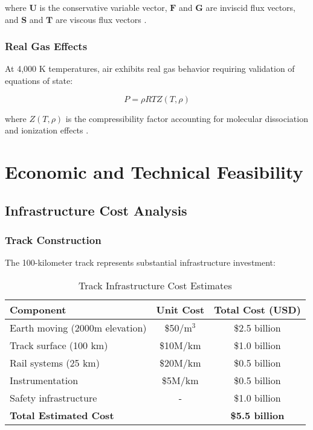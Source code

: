 \documentclass[12pt,a4paper]{article}
\begin{document}
where $\mathbf{U}$ is the conservative variable vector, $\mathbf{F}$ and $\mathbf{G}$ are inviscid flux vectors, and $\mathbf{S}$ and $\mathbf{T}$ are viscous flux vectors \cite{blazek2001computational}.

\subsubsection{Real Gas Effects}
At 4,000 K temperatures, air exhibits real gas behavior requiring validation of equations of state:

\begin{equation}
P = \rho R T Z(T,\rho)
\label{eq:real_gas}
\end{equation}

where $Z(T,\rho)$ is the compressibility factor accounting for molecular dissociation and ionization effects \cite{park1990nonequilibrium}.

\section{Economic and Technical Feasibility}

\subsection{Infrastructure Cost Analysis}

\subsubsection{Track Construction}
The 100-kilometer track represents substantial infrastructure investment:

\begin{table}[H]
\centering
\caption{Track Infrastructure Cost Estimates}
\label{tab:cost_estimates}
\begin{tabular}{lcc}
\toprule
Component & Unit Cost & Total Cost (USD) \\
\midrule
Earth moving (2000m elevation) & \$50/m$^3$ & \$2.5 billion \\
Track surface (100 km) & \$10M/km & \$1.0 billion \\
Rail systems (25 km) & \$20M/km & \$0.5 billion \\
Instrumentation & \$5M/km & \$0.5 billion \\
Safety infrastructure & - & \$1.0 billion \\
\midrule
\textbf{Total Estimated Cost} & & \textbf{\$5.5 billion} \\
\bottomrule
\end{tabular}
\end{table}
\end{document}
